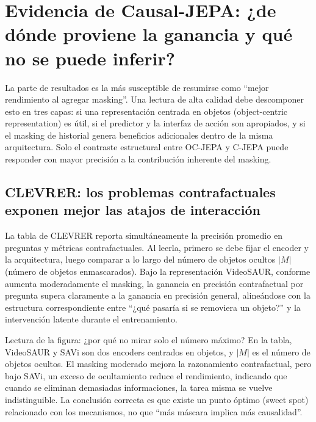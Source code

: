\section{Evidencia de Causal-JEPA: ¿de dónde proviene la ganancia y qué no se puede inferir?}

La parte de resultados es la más susceptible de resumirse como ``mejor rendimiento al agregar masking''. Una lectura de alta calidad debe descomponer esto en tres capas: si una representación centrada en objetos (object-centric representation) es útil, si el predictor y la interfaz de acción son apropiados, y si el masking de historial genera beneficios adicionales dentro de la misma arquitectura. Solo el contraste estructural entre OC-JEPA y C-JEPA puede responder con mayor precisión a la contribución inherente del masking.

\subsection{CLEVRER: los problemas contrafactuales exponen mejor las atajos de interacción}

La tabla de CLEVRER reporta simultáneamente la precisión promedio en preguntas y métricas contrafactuales. Al leerla, primero se debe fijar el encoder y la arquitectura, luego comparar a lo largo del número de objetos ocultos $|M|$ (número de objetos enmascarados). Bajo la representación VideoSAUR, conforme aumenta moderadamente el masking, la ganancia en precisión contrafactual por pregunta supera claramente a la ganancia en precisión general, alineándose con la estructura correspondiente entre ``¿qué pasaría si se removiera un objeto?'' y la intervención latente durante el entrenamiento.



\begin{knowledgebox}{Lectura de la figura: ¿por qué no mirar solo el número máximo?}
En la tabla, VideoSAUR y SAVi son dos encoders centrados en objetos, y $|M|$ es el número de objetos ocultos. El masking moderado mejora la razonamiento contrafactual, pero bajo SAVi, un exceso de ocultamiento reduce el rendimiento, indicando que cuando se eliminan demasiadas informaciones, la tarea misma se vuelve indistinguible. La conclusión correcta es que existe un punto óptimo (sweet spot) relacionado con los mecanismos, no que ``más máscara implica más causalidad''.
\end{knowledgebox}

